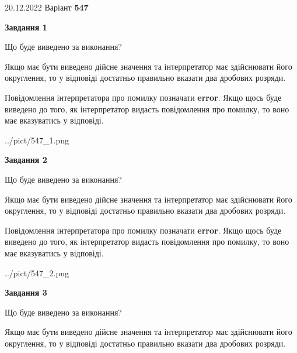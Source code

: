 \documentclass[12pt, ukrainian]{article}
\begin{document}
{20.12.2022 Варіант \No \textbf { 547 }\par}
{
\begin {Large}

{\begin {center}\textbf{Завдання 1}\end {center}}\par
Що буде виведено за виконання? \par

Якщо має бути виведено дійсне значення та інтерпретатор має здійснювати його округлення, 
то у відповіді достатньо правильно вказати два дробових розряди.

Повідомлення інтерпретатора про помилку позначати \textbf{error}.
Якщо щось буде виведено до того, як інтерпретатор видасть повідомлення про помилку, 
то воно має вказуватись у відповіді. \par

\begin{center}
	{../pict/547_1.png}
\end{center}
\newpage

{\begin {center}\textbf{Завдання 2}\end {center}}\par
Що буде виведено за виконання? \par

Якщо має бути виведено дійсне значення та інтерпретатор має здійснювати його округлення, 
то у відповіді достатньо правильно вказати два дробових розряди.

Повідомлення інтерпретатора про помилку позначати \textbf{error}.
Якщо щось буде виведено до того, як інтерпретатор видасть повідомлення про помилку, 
то воно має вказуватись у відповіді. \par

\begin{center}
	{../pict/547_2.png}
\end{center}
\newpage

{\begin {center}\textbf{Завдання 3}\end {center}}\par
Що буде виведено за виконання? \par

Якщо має бути виведено дійсне значення та інтерпретатор має здійснювати його округлення, 
то у відповіді достатньо правильно вказати два дробових розряди.


\end{Large}}
\end{document}
